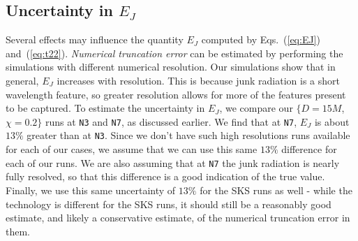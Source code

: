 \subsection{Uncertainty in $E_J$}
\label{subsec:ErrorEstimation}


Several effects may influence the quantity $E_J$ computed by
  Eqs.~(\ref{eq:EJ}) and~(\ref{eq:t22}).  {\it Numerical truncation
    error} can be estimated by performing the simulations with
  different numerical resolution.  Our simulations show that in general,
  $E_J$ increases with resolution. This is because junk radiation is
a short wavelength feature, so greater resolution allows for more of
the features present to be captured.  To estimate the
uncertainty in $E_J$, we compare our $\{D=15M$,
$\chi=0.2\}$ runs at {\tt N3} and {\tt N7}, as discussed earlier. We find that
at {\tt N7}, $E_J$ is about $13\%$ greater than at {\tt N3}. Since we don't
have such high resolutions runs available for each of our cases, we
assume that we can use this same $13\%$ difference for each of our
runs. We are also assuming that at {\tt N7} the junk
radiation is nearly fully resolved, so that this difference is a good
indication of the true value. Finally, we use this same uncertainty of
$13\%$ for the SKS runs as well - while the technology is different
for the SKS runs, it should still be a reasonably good estimate, and
likely a conservative estimate, of the numerical truncation error in them.


